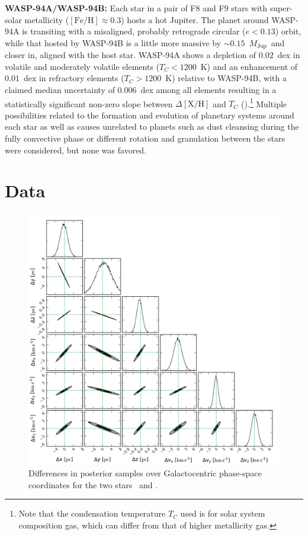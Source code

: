 \documentclass[modern, letterpaper]{aastex61}
\newcommand*\elem[1]{\ensuremath{\mathrm{#1}}}
\newcommand*\elemH[1]{\ensuremath{[\mathrm{#1}/\elem{H}]}}
\newcommand*{\feh}{\ensuremath{\elemH{Fe}}}
\newcommand{\sunanalog}{\text{Krios}}
\newcommand{\bizarreone}{\text{Kronos}}
\newcommand{\Tcondens}{\ensuremath{T_C}}
\newcommand{\mjupiter}{\ensuremath{M_\mathrm{Jup}}}
\begin{document}
{\bf WASP-94A/WASP-94B:}
Each star in a pair of F8 and F9 stars with super-solar metallicity
($\feh\approx 0.3$) hosts a hot Jupiter.
The planet around WASP-94A is transiting with a misaligned, probably retrograde
circular ($e<0.13$) orbit, while that hosted by WASP-94B is a little more
massive by $\sim 0.15$~\mjupiter\ and closer in, aligned with the host star.
WASP-94A shows a depletion of $0.02$~dex in volatile and moderately volatile
elements ($\Tcondens < 1200$~K) and an enhancement of $0.01$~dex in refractory
elements ($\Tcondens>1200$~K) relative to WASP-94B, with a claimed median
uncertainty of $0.006$~dex among all elements
resulting in a statistically significant non-zero slope between
$\Delta\elemH{X}$ and $\Tcondens$ (\citealt{Teske:2016aa}).\footnote{
  Note that the condensation
  temperature $\Tcondens$ used is for solar system composition
  gas, which can differ from that of higher metallicity gas.}
Multiple possibilities related to the formation and evolution
of planetary systems around each star as well as causes unrelated to planets
such as dust cleansing during the fully convective phase or different rotation
and granulation between the stars were considered, but none was favored.


\section{Data}
\label{sec:data}



\begin{figure}[htbp]
  \begin{center}
    \includegraphics[width=\linewidth]{dx_dv_posterior.pdf}
  \end{center}
  \caption{%
    Differences in posterior samples over Galactocentric phase-space coordinates
    for the two stars \sunanalog\ and \bizarreone.
    \label{fig:dxdv}}
\end{figure}
\end{document}

